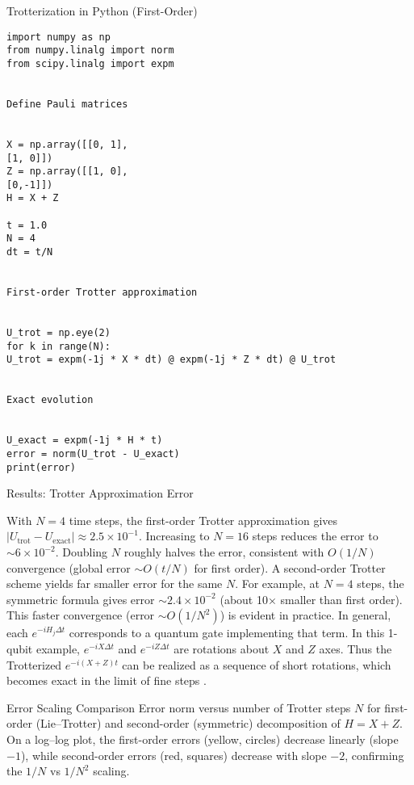 \documentclass{beamer}
\begin{document}
\begin{frame}[fragile]{Trotterization in Python (First-Order)}
\lstset{basicstyle=\ttfamily\footnotesize, language=Python}
\begin{lstlisting}
import numpy as np
from numpy.linalg import norm
from scipy.linalg import expm


Define Pauli matrices


X = np.array([[0, 1],
[1, 0]])
Z = np.array([[1, 0],
[0,-1]])
H = X + Z

t = 1.0
N = 4
dt = t/N


First-order Trotter approximation


U_trot = np.eye(2)
for k in range(N):
U_trot = expm(-1j * X * dt) @ expm(-1j * Z * dt) @ U_trot


Exact evolution


U_exact = expm(-1j * H * t)
error = norm(U_trot - U_exact)
print(error)
\end{lstlisting}
\end{frame}

\begin{frame}{Results: Trotter Approximation Error}

With $N=4$ time steps, the first-order Trotter approximation gives $|U_{\text{trot}} - U_{\text{exact}}| \approx 2.5\times10^{-1}$. Increasing to $N=16$ steps reduces the error to $\sim6\times10^{-2}$. Doubling $N$ roughly halves the error, consistent with $O(1/N)$ convergence (global error $\sim O(t/N)$ for first order).
A second-order Trotter scheme yields far smaller error for the same $N$. For example, at $N=4$ steps, the symmetric formula gives error $\sim2.4\times10^{-2}$ (about 10× smaller than first order). This faster convergence (error $\sim O(1/N^2)$) is evident in practice.
In general, each $e^{-iH_j \Delta t}$ corresponds to a quantum gate implementing that term. In this 1-qubit example, $e^{-iX\Delta t}$ and $e^{-iZ\Delta t}$ are rotations about $X$ and $Z$ axes. Thus the Trotterized $e^{-i(X+Z)t}$ can be realized as a sequence of short rotations, which becomes exact in the limit of fine steps . \end{frame}


\begin{frame}{Error Scaling Comparison}
Error norm versus number of Trotter steps $N$ for first-order (Lie–Trotter) and second-order (symmetric) decomposition of $H=X+Z$. On a log–log plot, the first-order errors (yellow, circles) decrease linearly (slope $-1$), while second-order errors (red, squares) decrease with slope $-2$, confirming the $1/N$ vs $1/N^2$ scaling.
\end{frame}
\end{document}
